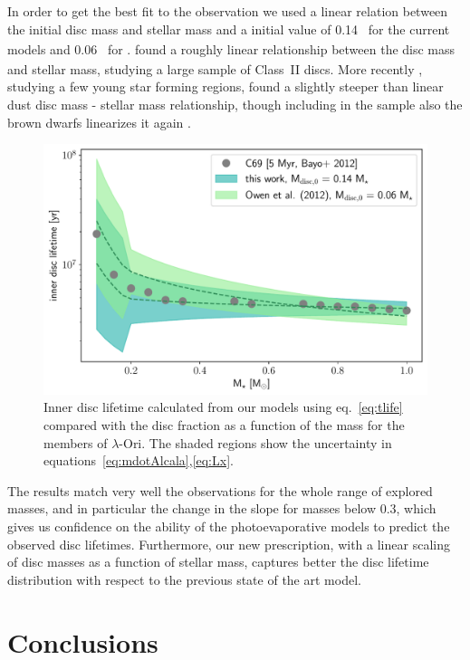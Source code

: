 \documentclass[usenatbib,useAMS,usedcolumn]{mnras}
\begin{document}
In order to get the best fit to the observation we used a linear relation between the initial disc mass and stellar mass and a initial value of \SI{0.14}{_\star} for the current models and \SI{0.06}{_\star} for .
 found a roughly linear relationship between the disc mass and stellar mass, studying a large sample of Class~II discs. More recently , studying a few young star forming regions, found a slightly steeper than linear dust disc mass - stellar mass relationship, though including in the sample also the brown dwarfs linearizes it again .
\begin{figure}
    \centering
    \includegraphics[width=\columnwidth]{Figure11}
    \caption{Inner disc lifetime calculated from our models using eq.~\ref{eq:tlife} compared with the disc fraction as a function of the mass for the members of $\lambda$-Ori. The shaded regions show the uncertainty in equations~\ref{eq:mdotAlcala},\ref{eq:Lx}. \label{fig:obs}}
\end{figure}
The results match very well the observations for the whole range of explored masses, and in particular the change in the slope for masses below \SI{0.3}{\solarmass}, which gives us confidence on the ability of the photoevaporative models to predict the observed disc lifetimes. Furthermore, our new prescription, with a linear scaling of disc masses as a function of stellar mass, captures better the disc lifetime distribution with respect to the previous state of the art model.

\section{Conclusions}\label{sec:conclusions}
\end{document}
